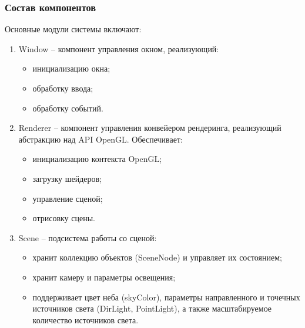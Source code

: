 
\subsubsection{Состав компонентов}

Основные модули системы включают:

\begin{enumerate}
    \item Window -- компонент управления окном, реализующий:

    \begin{itemize}[itemindent=\parindent,leftmargin=\parindent]
        \item инициализацию окна;
        \item обработку ввода;
        \item обработку событий.
    \end{itemize}

    \item Renderer -- компонент управления конвейером рендеринга, реализующий абстракцию над API OpenGL. Обеспечивает:

    \begin{itemize}[itemindent=\parindent,leftmargin=\parindent]
        \item инициализацию контекста OpenGL;
        \item загрузку шейдеров;
        \item управление сценой;
        \item отрисовку сцены.
    \end{itemize}

    \item Scene -- подсистема работы со сценой:

    \begin{itemize}[itemindent=\parindent,leftmargin=\parindent]
        \item хранит коллекцию объектов (SceneNode) и управляет их состоянием;
        \item хранит камеру и параметры освещения;
        \item поддерживает цвет неба (skyColor), параметры направленного и точечных источников света (DirLight, PointLight), а также масштабируемое количество источников света.
    \end{itemize}


\end{enumerate}

